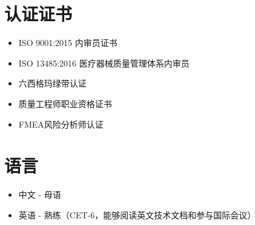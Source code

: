 \documentclass[a4paper,10pt]{article}
\begin{document}
\section*{ 认证证书}
\begin{itemize}[label=]
    \item ISO 9001:2015 内审员证书
    \item ISO 13485:2016 医疗器械质量管理体系内审员
    \item 六西格玛绿带认证
    \item 质量工程师职业资格证书
    \item FMEA风险分析师认证
\end{itemize}

\section*{ 语言}
\begin{itemize}[label=]
    \item 中文 - 母语
    \item 英语 - 熟练（CET-6，能够阅读英文技术文档和参与国际会议）
\end{itemize}

\end{document}
